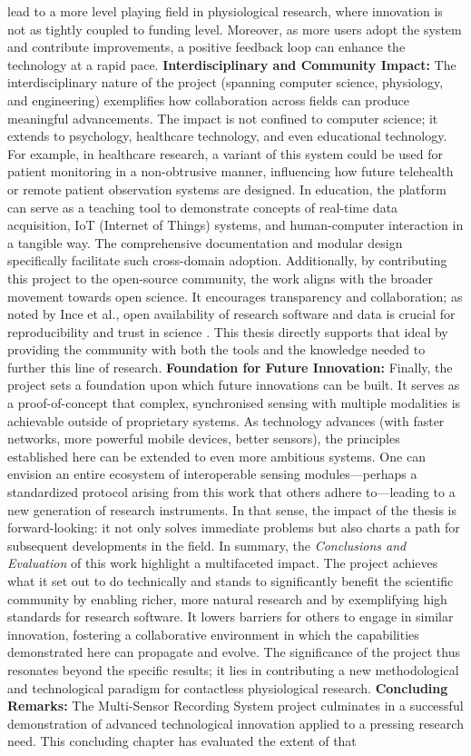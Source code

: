 \documentclass[11pt,a4paper]{report}
\begin{document}
{lead to a more level playing field in physiological research, where innovation is not as tightly coupled to funding level. Moreover, as more users adopt the system and contribute improvements, a positive feedback loop can enhance the technology at a rapid pace. \textbf{Interdisciplinary and Community Impact:} The interdisciplinary nature of the project (spanning computer science, physiology, and engineering) exemplifies how collaboration across fields can produce meaningful advancements. The impact is not confined to computer science; it extends to psychology, healthcare technology, and even educational technology. For example, in healthcare research, a variant of this system could be used for patient monitoring in a non-obtrusive manner, influencing how future telehealth or remote patient observation systems are designed. In education, the platform can serve as a teaching tool to demonstrate concepts of real-time data acquisition, IoT (Internet of Things) systems, and human-computer interaction in a tangible way. The comprehensive documentation and modular design specifically facilitate such cross-domain adoption. Additionally, by contributing this project to the open-source community, the work aligns with the broader movement towards open science. It encourages transparency and collaboration; as noted by Ince et al., open availability of research software and data is crucial for reproducibility and trust in science \cite{Ince2012}. This thesis directly supports that ideal by providing the community with both the tools and the knowledge needed to further this line of research. \textbf{Foundation for Future Innovation:} Finally, the project sets a foundation upon which future innovations can be built. It serves as a proof-of-concept that complex, synchronised sensing with multiple modalities is achievable outside of proprietary systems. As technology advances (with faster networks, more powerful mobile devices, better sensors), the principles established here can be extended to even more ambitious systems. One can envision an entire ecosystem of interoperable sensing modules—perhaps a standardized protocol arising from this work that others adhere to—leading to a new generation of research instruments. In that sense, the impact of the thesis is forward-looking: it not only solves immediate problems but also charts a path for subsequent developments in the field. In summary, the \textit{Conclusions and Evaluation} of this work highlight a multifaceted impact. The project achieves what it set out to do technically and stands to significantly benefit the scientific community by enabling richer, more natural research and by exemplifying high standards for research software. It lowers barriers for others to engage in similar innovation, fostering a collaborative environment in which the capabilities demonstrated here can propagate and evolve. The significance of the project thus resonates beyond the specific results; it lies in contributing a new methodological and technological paradigm for contactless physiological research. \noindent\textbf{Concluding Remarks:} The Multi-Sensor Recording System project culminates in a successful demonstration of advanced technological innovation applied to a pressing research need. This concluding chapter has evaluated the extent of that }
\end{document}
